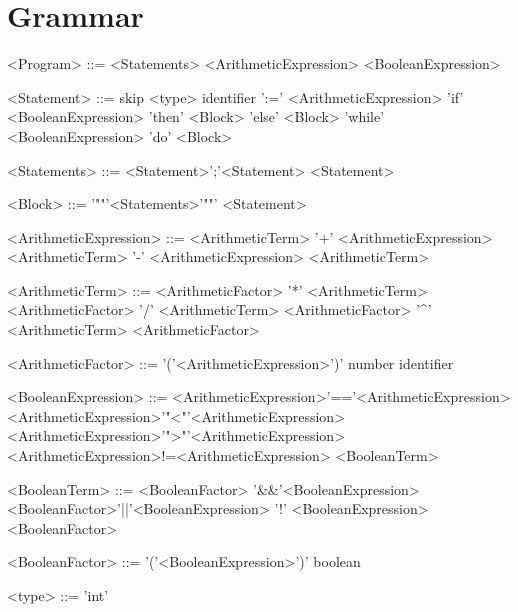 \section*{Grammar}

\begin{grammar}
    <Program> ::= <Statements>
    \alt <ArithmeticExpression>
    \alt <BooleanExpression>

    <Statement> ::= skip
    \alt <type> identifier ':=' <ArithmeticExpression>
    \alt 'if' <BooleanExpression> 'then' <Block> 'else' <Block>
    \alt 'while' <BooleanExpression> 'do' <Block>

    <Statements> ::= <Statement>';'<Statement>
    \alt <Statement>

    <Block> ::= '"{"'<Statements>'"}"'
    \alt <Statement>

    <ArithmeticExpression> ::= <ArithmeticTerm> '+' <ArithmeticExpression>
    \alt <ArithmeticTerm> '-' <ArithmeticExpression>
    \alt <ArithmeticTerm>

    <ArithmeticTerm> ::= <ArithmeticFactor> '*' <ArithmeticTerm>
    \alt <ArithmeticFactor> '/' <ArithmeticTerm>
    \alt <ArithmeticFactor> '^' <ArithmeticTerm>
    \alt <ArithmeticFactor>

    <ArithmeticFactor> ::= '('<ArithmeticExpression>')'
    \alt number
    \alt identifier

    <BooleanExpression> ::= <ArithmeticExpression>'=='<ArithmeticExpression>
    \alt <ArithmeticExpression>'"<"'<ArithmeticExpression>
    \alt <ArithmeticExpression>'">"'<ArithmeticExpression>
    \alt <ArithmeticExpression>!=<ArithmeticExpression>
    \alt <BooleanTerm>

    <BooleanTerm> ::= <BooleanFactor> '\&\&'<BooleanExpression>
    \alt <BooleanFactor>'||'<BooleanExpression>
    \alt '!' <BooleanExpression>
    \alt <BooleanFactor>

    <BooleanFactor> ::= '('<BooleanExpression>')'
    \alt boolean

    <type> ::= 'int'
\end{grammar}

